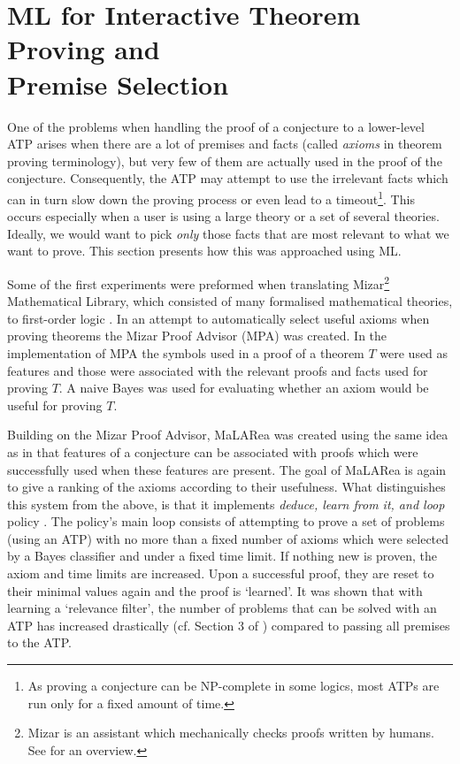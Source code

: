 \documentclass{article}
\begin{document}
\section{ML for Interactive Theorem Proving and\\ Premise Selection}

One of the problems when handling the proof of a conjecture to a lower-level
ATP arises when there are a lot of premises and facts (called \emph{axioms} in
theorem proving terminology), but very few of them are actually used in the
proof of the conjecture. Consequently, the ATP may attempt to use the
irrelevant facts which can in turn slow down the proving process or even lead
to a timeout\footnote{As proving a conjecture can be NP-complete in some
logics, most ATPs are run only for a fixed amount of time.}. This occurs
especially when a user is using a large theory or a set of several theories.
Ideally, we would want to pick \emph{only} those facts that are most relevant
to what we want to prove. This section presents how this was approached using
ML.

Some of the first experiments were preformed when translating
Mizar\footnote{Mizar is an assistant which mechanically checks proofs written
by humans. See \cite{MizarOverview} for an overview.} Mathematical Library,
which consisted of many formalised mathematical theories, to first-order logic
\citep{MizarProofAdvisor}. In an attempt to automatically select useful axioms
when proving theorems the Mizar Proof Advisor (MPA) was created. In the
implementation of MPA the symbols used in a proof of a theorem $T$ were used as
features and those were associated with the relevant proofs and facts used for
proving $T$. A naive Bayes was used for evaluating whether an axiom would be
useful for proving $T$. 

Building on the Mizar Proof Advisor, MaLARea \citep{MaLARea} was created using
the same idea as in \cite{MizarProofAdvisor} that features of a conjecture can
be associated with proofs which were successfully used when these features are
present. The goal of MaLARea is again to give a ranking of the axioms according
to their usefulness. What distinguishes this system from the above, is that it
implements \emph{deduce, learn from it, and loop} policy \citep[p.~3]{MaLARea}.
The policy's main loop consists of attempting to prove a set of problems (using
an ATP) with no more than a fixed number of axioms which were selected by
a Bayes classifier and under a fixed time limit. If nothing new is proven, the
axiom and time limits are increased. Upon a successful proof, they are reset to
their minimal values again and the proof is `learned'. It was shown that with
learning a `relevance filter', the number of problems that can be solved with
an ATP has increased drastically (cf. Section 3 of \cite{MaLARea}) compared to
passing all premises to the ATP.
\end{document}
